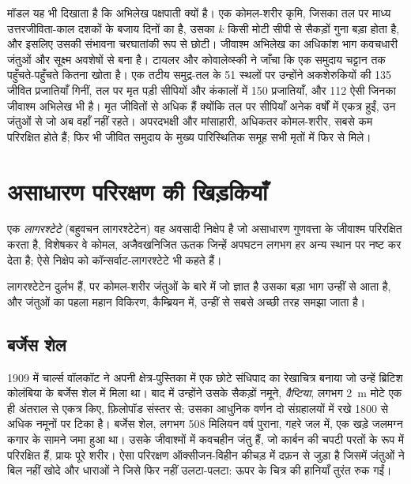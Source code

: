 मॉडल यह भी दिखाता है कि अभिलेख पक्षपाती क्यों है। एक कोमल-शरीर कृमि, जिसका तल पर माध्य उत्तरजीविता-काल
दशकों के बजाय दिनों का है, उसका $k$ किसी मोटी सीपी से सैकड़ों गुना बड़ा होता है,
और इसलिए उसकी संभावना चरघातांकी रूप से छोटी। जीवाश्म अभिलेख का अधिकांश भाग कवचधारी जंतुओं
और सूक्ष्म अवशेषों से बना है। टायलर और कोवालेव्स्की ने जाँचा कि एक समुदाय चट्टान तक
पहुँचते-पहुँचते कितना खोता है। एक तटीय समुद्र-तल के 51 स्थलों पर उन्होंने अकशेरुकियों की 135 जीवित प्रजातियाँ
गिनीं, तल पर मृत पड़ी सीपियों और कंकालों में 150 प्रजातियाँ, और 112 ऐसी जिनका
जीवाश्म अभिलेख भी है। मृत जीवितों से अधिक हैं क्योंकि तल पर सीपियाँ
अनेक वर्षों में एकत्र हुईं, उन जंतुओं से जो अब वहाँ नहीं रहते। अपरदभक्षी और मांसाहारी, अधिकतर
कोमल-शरीर, सबसे कम परिरक्षित होते हैं; फिर भी जीवित समुदाय के मुख्य पारिस्थितिक समूह
सभी मृतों में फिर से मिले।

\section{असाधारण परिरक्षण की खिड़कियाँ}\label{sec:b2:palaeoenvironments:lagerstatten}

\begin{definition}[लागरश्टेटे]\label{def:b2:palaeoenvironments:lagerstatte}
एक \emph{लागरश्टेटे} (बहुवचन लागरश्टेटेन) वह अवसादी निक्षेप है जो
असाधारण गुणवत्ता के जीवाश्म परिरक्षित करता है, विशेषकर वे कोमल, अजैवखनिजित ऊतक जिन्हें
अपघटन लगभग हर अन्य स्थान पर नष्ट कर देता है; ऐसे निक्षेप को कॉन्सर्वाट-लागरश्टेटे भी कहते हैं।
\end{definition}

लागरश्टेटेन दुर्लभ हैं, पर कोमल-शरीर जंतुओं के बारे में जो ज्ञात है उसका बड़ा भाग उन्हीं से आता है, और
जंतुओं का पहला महान विकिरण, कैम्ब्रियन में, उन्हीं से सबसे अच्छी तरह समझा जाता है।

\subsection*{बर्जेस शेल}

1909 में चार्ल्स वॉलकॉट ने अपनी क्षेत्र-पुस्तिका में एक छोटे संधिपाद का रेखाचित्र बनाया जो उन्हें ब्रिटिश कोलंबिया के
बर्जेस शेल में मिला था। बाद में उन्होंने उसके सैकड़ों
नमूने, \emph{वैप्टिया}, लगभग \qty{2}{m} मोटे एक ही अंतराल से एकत्र किए, फ़िलोपॉड
संस्तर से; उसका आधुनिक वर्णन दो संग्रहालयों में रखे 1800 से अधिक नमूनों पर टिका है। बर्जेस
शेल, लगभग 508 मिलियन वर्ष पुराना, गहरे जल में, एक खड़े जलमग्न
कगार के सामने जमा हुआ था। उसके जीवाश्मों में कवचहीन जंतु हैं, जो कार्बन की चपटी परतों के रूप में परिरक्षित हैं,
प्रायः पूरे शरीर। ऐसा परिरक्षण ऑक्सीजन-विहीन कीचड़ में दफ़न से जुड़ा है जिसमें जंतुओं ने
बिल नहीं खोदे और धाराओं ने जिसे फिर नहीं उलटा-पलटा: ऊपर के चित्र की हानियाँ तुरंत रुक गईं।

